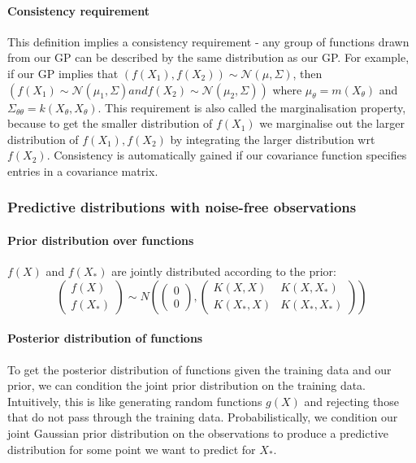 \paragraph{Consistency requirement}
This definition implies a consistency requirement - any group of functions drawn from our GP can be described by the same distribution as our GP. For example, if our GP implies that $(f(X_1), f(X_2)) \sim \mathcal{N}(\mu, \Sigma)$, then $(f(X_1) \sim \mathcal{N}(\mu_1, \Sigma) and f(X_2) \sim \mathcal{N}(\mu_2, \Sigma))$ where $\mu_{\theta} = m(X_{\theta})$ and $\Sigma_{\theta\theta} = k(X_{\theta}, X_{\theta})$. This requirement is also called the marginalisation property, because to get the smaller distribution of $f(X_1)$ we marginalise out the larger distribution of $f(X_1), f(X_2)$ by integrating the larger distribution wrt $f(X_2)$. Consistency is automatically gained if our covariance function specifies entries in a covariance matrix.
    
\subsubsection{Predictive distributions with noise-free observations}
\paragraph{Prior distribution over functions}
$f(X)$ and $f(X_*)$ are jointly distributed according to the prior:
\begin{equation} \label{eq:joint_prior}
    \begin{pmatrix}
        f(X) \\ f(X_*)
    \end{pmatrix} \sim N\left(
    \begin{pmatrix}
        0 \\ 0
    \end{pmatrix},
    \begin{pmatrix}
        K(X,X) & K(X,X_*) \\ 
        K(X_*,X) & K(X_*,X_*)
    \end{pmatrix}
    \right)
\end{equation}

\paragraph{Posterior distribution of functions}
To get the posterior distribution of functions given the training data and our prior, we can condition the joint prior distribution on the training data. Intuitively, this is like generating random functions $g(X)$ and rejecting those that do not pass through the training data. Probabilistically, we condition our joint Gaussian prior distribution on the observations to produce a predictive distribution for some point we want to predict for $X_*$. 

